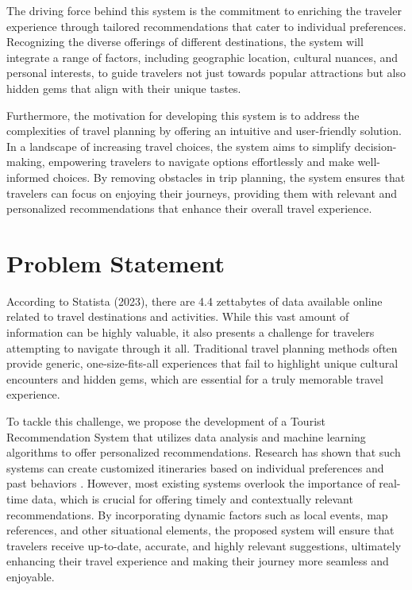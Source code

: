     The driving force behind this system is the commitment to enriching the traveler experience through tailored recommendations that cater to individual preferences. Recognizing the diverse offerings of different destinations, the system will integrate a range of factors, including geographic location, cultural nuances, and personal interests, to guide travelers not just towards popular attractions but also hidden gems that align with their unique tastes.
    
    Furthermore, the motivation for developing this system is to address the complexities of travel planning by offering an intuitive and user-friendly solution. In a landscape of increasing travel choices, the system aims to simplify decision-making, empowering travelers to navigate options effortlessly and make well-informed choices. By removing obstacles in trip planning, the system ensures that travelers can focus on enjoying their journeys, providing them with relevant and personalized recommendations that enhance their overall travel experience.
            

\section{Problem Statement}
    According to Statista (2023), there are 4.4 zettabytes of data available online related to travel destinations and activities. While this vast amount of information can be highly valuable, it also presents a challenge for travelers attempting to navigate through it all. Traditional travel planning methods often provide generic, one-size-fits-all experiences that fail to highlight unique cultural encounters and hidden gems, which are essential for a truly memorable travel experience.

    To tackle this challenge, we propose the development of a Tourist Recommendation System that utilizes data analysis and machine learning algorithms to offer personalized recommendations. Research has shown that such systems can create customized itineraries based on individual preferences and past behaviors \cite{computation12030059}. However, most existing systems overlook the importance of real-time data, which is crucial for offering timely and contextually relevant recommendations. By incorporating dynamic factors such as local events, map references, and other situational elements, the proposed system will ensure that travelers receive up-to-date, accurate, and highly relevant suggestions, ultimately enhancing their travel experience and making their journey more seamless and enjoyable.
        
